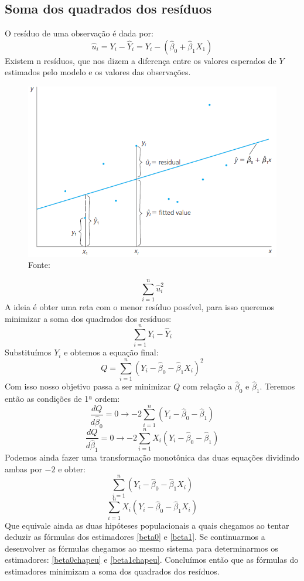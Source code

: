 \documentclass[12pt,a4paper,oneside,brazil]{abntex2}
\begin{document}
\subsection{Soma dos quadrados dos resíduos}
O resíduo de uma observação é dada por:
\[ \hat{u}_{i} = Y_i - \hat{Y}_{i} = Y_i - (\hat{\beta}_0 + \hat{\beta}_1 X_1) \]
Existem n resíduos, que nos dizem a diferença entre os valores esperados de $Y$ estimados pelo modelo e os valores das observações.
\begin{figure}[h]
\includegraphics[scale=0.7]{Residual.png}
\centering
\caption{Fonte: \cite[p. 28]{wooldridge}}
\end{figure}
\[ \sum \limits_{i = 1}^{n} \hat{u}_i^2 \]
A ideia é obter uma reta com o menor resíduo possível, para isso queremos minimizar a soma dos quadrados dos resíduos:
\[ \sum \limits_{i = 1}^{n} Y_i - \hat{Y}_i\]
Substituímos $Y_i$ e obtemos a equação final:
\[  Q= \sum \limits_{i = 1}^{n} ( Y_i - \hat{\beta}_0 - \hat{\beta}_1 X_i)^2 \]
Com isso nosso objetivo passa a ser minimizar $Q$ com relação a $\hat{\beta}_0$ e $\hat{\beta}_1$.
\clearpage
Teremos então as condições de 1ª ordem:
\[\frac{dQ}{d \hat{\beta}_0} = 0 \rightarrow -2 \sum \limits^n_{i=1} (Y_i - \hat{\beta}_0 - \hat{\beta}_1) \]
\[ \frac{dQ}{d \hat{\beta}_1} = 0 \rightarrow  -2 \sum \limits^n_{i=1} X_i (Y_i - \hat{\beta}_0 - \hat{\beta}_1)\]
Podemos ainda fazer uma transformação monotônica das duas equações dividindo ambas por $-2$ e obter:
 \[\sum \limits_{i = 1}^{n} ( Y_i - \hat{\beta}_0 - \hat{\beta}_1 X_i) \]
 \[\sum \limits_{i = 1}^{n} X_i ( Y_i - \hat{\beta}_0 - \hat{\beta}_1 X_i) \]
 Que equivale ainda as duas hipóteses populacionais a quais chegamos ao tentar deduzir as fórmulas dos estimadores \ref{beta0} e \ref{beta1}. Se continuarmos a desenvolver as fórmulas chegamos ao mesmo sistema para determinarmos os estimadores: \ref{beta0chapeu} e \ref{beta1chapeu}. Concluímos então que as fórmulas do estimadores minimizam a soma dos quadrados dos resíduos. \newline
 
\end{document}
